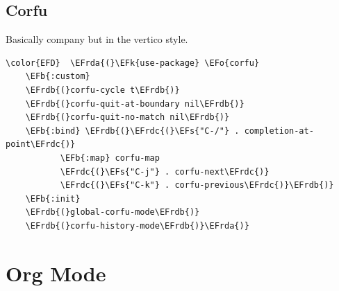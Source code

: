 \documentclass[11pt]{article}
\newcommand{\EFs}[1]{\textcolor{EFs}{#1}} %
\newcommand{\EFk}[1]{\textcolor{EFk}{#1}} %
\newcommand{\EFb}[1]{\textcolor{EFb}{#1}} %
\newcommand{\EFo}[1]{\textcolor{EFo}{#1}} %
\newcommand{\EFrda}[1]{\textcolor{EFrda}{#1}} %
\newcommand{\EFrdb}[1]{\textcolor{EFrdb}{#1}} %
\newcommand{\EFrdc}[1]{\textcolor{EFrdc}{#1}} %
\begin{document}
\subsection{Corfu}
\label{sec:orgdf88251}
Basically company but in the vertico style.

\begin{Code}
\begin{Verbatim}
\color{EFD}  \EFrda{(}\EFk{use-package} \EFo{corfu}
    \EFb{:custom}
    \EFrdb{(}corfu-cycle t\EFrdb{)}
    \EFrdb{(}corfu-quit-at-boundary nil\EFrdb{)}
    \EFrdb{(}corfu-quit-no-match nil\EFrdb{)}
    \EFb{:bind} \EFrdb{(}\EFrdc{(}\EFs{"C-/"} . completion-at-point\EFrdc{)}
           \EFb{:map} corfu-map
           \EFrdc{(}\EFs{"C-j"} . corfu-next\EFrdc{)}
           \EFrdc{(}\EFs{"C-k"} . corfu-previous\EFrdc{)}\EFrdb{)}
    \EFb{:init}
    \EFrdb{(}global-corfu-mode\EFrdb{)}
    \EFrdb{(}corfu-history-mode\EFrdb{)}\EFrda{)}
\end{Verbatim}
\end{Code}

\section{Org Mode}
\label{sec:org75c4e22}
\end{document}
